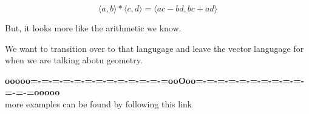 \documentclass{ximera}
\begin{document}
\[    \langle a, b \rangle  * \langle c, d \rangle =   \langle a c - b d, b c + a d \rangle   \]



But, it looks more like the arithmetic we know.  


We want to transition over to that langugage and leave the vector langugage for when we are talking abotu geometry.























\begin{center}
\textbf{\textcolor{green!50!black}{ooooo=-=-=-=-=-=-=-=-=-=-=-=-=ooOoo=-=-=-=-=-=-=-=-=-=-=-=-=ooooo}} \\

more examples can be found by following this link\\ 

\end{center}
\end{document}
